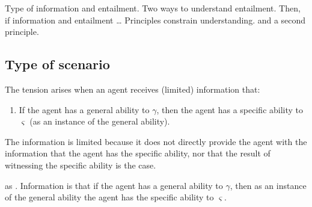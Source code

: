 \begin{note}
  Type of information and entailment.
  Two ways to understand entailment.
  Then, if information and entailment \dots
  Principles constrain understanding.
  \uRa{} and a second principle.
\end{note}

\subsection{Type of scenario}
\label{sec:type-scenario}

\begin{note}
  The tension arises when an agent receives (limited) information that:
  \begin{enumerate}[label=(\GSI{}), ref=(\GSI{})]
  \item If the agent has a general ability to \(\gamma\), then the agent has a specific ability to \(\varsigma\) (as an instance of the general ability).
  \end{enumerate}
  The information is limited because it does not directly provide the agent with the information that the agent has the specific ability, nor that the result of witnessing the specific ability is the case.

  \GSI{} as \gsi{}.
  Information is that if the agent has a general ability to \(\gamma\), then as an instance of the general ability the agent has the specific ability to \(\varsigma\).


\end{note}
